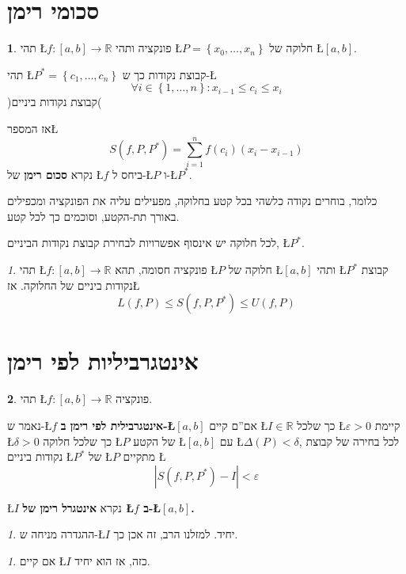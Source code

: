 \documentclass[english,hebrew]{article}
\theoremstyle{remark}
\newtheorem*{rem*}{\protect\remarkname}
\theoremstyle{definition}
\newtheorem*{defn*}{\protect\definitionname}
\theoremstyle{plain}
\theoremstyle{remark}
\newtheorem{claim}[thm]{\protect\claimname}
\theoremstyle{plain}
\theoremstyle{plain}
\providecommand{\claimname}{טענה}
\providecommand{\definitionname}{הגדרה}
\providecommand{\remarkname}{הערה}
\begin{document}
\section{סכומי רימן}
\begin{defn*}
תהי \L{$f:\left[a,b\right]\rightarrow\mathbb{R}$} פונקציה ותהי \L{$P=\left\{ x_{0},\dots,x_{n}\right\} $}
חלוקה של \L{$\left[a,b\right]$}.

תהי \L{$P^{*}=\left\{ c_{1},\dots,c_{n}\right\} $} קבוצת נקודות כך
ש-\L{%
\[
\forall i\in\left\{ 1,\dots,n\right\} :x_{i-1}\le c_{i}\le x_{i}
\]
}%
)קבוצת נקודות ביניים(

אז המספר\L{%
\[
S\left(f,P,P^{*}\right)=\underset{i=1}{\overset{n}{\sum}}f\left(c_{i}\right)\left(x_{i}-x_{i-1}\right)
\]
}%
 נקרא \textbf{סכום רימן} של \L{$f$} ביחס ל-\L{$P$} ו-\L{$P^{*}$}.

כלומר, בוחרים נקודה כלשהי בכל קטע בחלוקה, מפעילים עליה את הפונקציה
ומכפילים באורך תת-הקטע, וסוכמים כך לכל קטע.

לכל חלוקה יש אינסוף אפשרויות לבחירת קבוצת נקודות הביניים, \L{$P^{*}$}.
\end{defn*}
\begin{claim}
תהי \L{$f:\left[a,b\right]\rightarrow\mathbb{R}$} פונקציה חסומה,
תהא \L{$P$} חלוקה של \L{$\left[a,b\right]$} ותהי \L{$P^{*}$} קבוצת
נקודות ביניים של החלוקה. אז\L{%
\[
L\left(f,P\right)\le S\left(f,P,P^{*}\right)\le U\left(f,P\right)
\]
}%
\end{claim}

\section{אינטגרביליות לפי רימן}
\begin{defn*}
תהי \L{$f:\left[a,b\right]\rightarrow\mathbb{R}$} פונקציה. 

נאמר ש-\L{$f$} \textbf{אינטגרבילית לפי רימן ב-\L{$\left[a,b\right]$}}
אם\textquotedblright ם קיים \L{$I\in\mathbb{R}$} כך שלכל \L{$\varepsilon>0$}
קיימת \L{$\delta>0$} כך שלכל חלוקה \L{$P$} של הקטע \L{$\left[a,b\right]$}
עם \L{$\Delta\left(P\right)<\delta$}, לכל בחירה של קבוצת נקודות ביניים
\L{$P^{*}$} של \L{$P$} מתקיים \L{%
\[
\left|S\left(f,P,P^{*}\right)-I\right|<\varepsilon
\]
}%

\L{$I$} נקרא \textbf{אינטגרל רימן של \L{$f$} ב-\L{$\left[a,b\right]$}.}
\end{defn*}
\begin{rem*}
ההגדרה מניחה ש-\L{$I$} יחיד. למזלנו הרב, זה אכן כך.
\end{rem*}
\begin{claim}
אם קיים \L{$I$} כזה, אז הוא יחיד. 
\end{claim}
\end{document}
